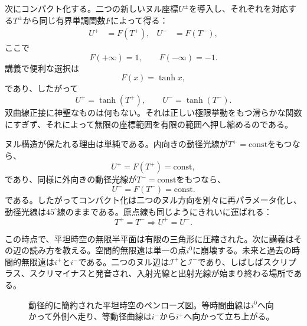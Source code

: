 次にコンパクト化する。二つの新しいヌル座標\(U^\pm\)を導入し、それぞれを対応する\(T^\pm\)から同じ有界単調関数\(F\)によって得る：
\begin{align}
U^+ &= F(T^+), &
U^- &= F(T^-),
\end{align}
ここで
\begin{equation}
F(+\infty)=1,
\qquad
F(-\infty)=-1.
\end{equation}
講義で便利な選択は
\begin{equation}
F(x)=\tanh x,
\end{equation}
であり、したがって
\begin{equation}
U^+ = \tanh(T^+),
\qquad
U^- = \tanh(T^-).
\end{equation}
双曲線正接に神聖なものは何もない。それは正しい極限挙動をもつ滑らかな関数にすぎず、それによって無限の座標範囲を有限の範囲へ押し縮めるのである。

ヌル構造が保たれる理由は単純である。内向きの動径光線が\(T^+=\text{const}\)をもつなら、
\[
U^+=F(T^+)=\text{const},
\]
であり、同様に外向きの動径光線が\(T^-=\text{const}\)をもつなら、
\[
U^-=F(T^-)=\text{const}.
\]
である。したがってコンパクト化は二つのヌル方向を別々に再パラメータ化し、動径光線は\(45^\circ\)線のままである。原点線も同じようにきれいに運ばれる：
\[
T^+=T^- \Longrightarrow U^+=U^-.
\]

この時点で、平坦時空の無限半平面は有限の三角形に圧縮された。次に講義はその辺の読み方を教える。空間的無限遠は単一の点\(i^0\)に崩壊する。未来と過去の時間的無限遠は\(i^+\)と\(i^-\)である。二つのヌル辺は\(\mathcal{I}^+\)と\(\mathcal{I}^-\)であり、しばしばスクリプラス、スクリマイナスと発音され、入射光線と出射光線が始まり終わる場所である。

\begin{figure}[htbp]
\centering
{}
\caption{動径的に簡約された平坦時空のペンローズ図。等時間曲線は\(i^0\)へ向かって外側へ走り、等動径曲線は\(i^-\)から\(i^+\)へ向かって立ち上がる。}
\end{figure}

